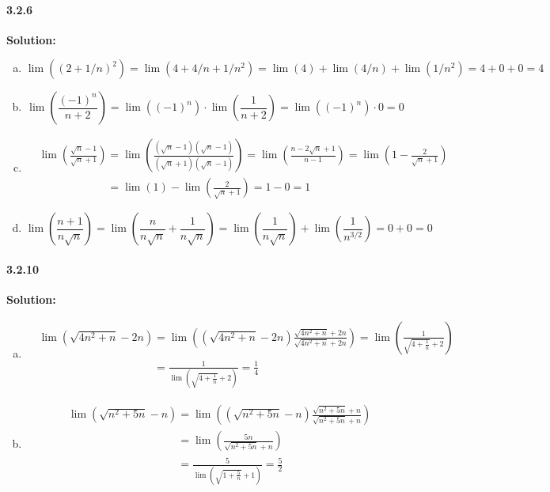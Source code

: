 \documentclass[11pt]{article}
\begin{document}
	\paragraph{3.2.6}\textbf{Solution:}
		\begin{enumerate}[(a)]
			\item 
				\[\lim \left((2 + 1/n)^2 \right) = \lim (4 + 4/n + 1/n^2) = \lim (4) + \lim(4/n) + \lim(1/n^2) = 4 + 0 + 0 = 4\]
			\item
				\[\lim \left(\frac{(-1)^n}{n + 2}\right) = \lim \left((-1)^n\right) \cdot \lim \left(\frac{1}{n + 2}\right) = \lim \left((-1)^n\right) \cdot 0 = 0 \]
			\item
				\begin{align}
					&\lim \left(\frac{\sqrt{n} - 1}{\sqrt{n} + 1}\right) = \lim \left(\frac{(\sqrt{n} - 1)(\sqrt{n} - 1)}{(\sqrt{n} + 1)(\sqrt{n} - 1)} \right) = \lim \left(\frac{n - 2\sqrt{n} + 1}{n - 1} \right) = \lim \left(1 - \frac{2}{\sqrt{n} + 1} \right)\nonumber\\
					&\phantom{\lim \left(\frac{\sqrt{n} - 1}{\sqrt{n} + 1}\right)} = \lim (1) - \lim \left(\frac{2}{\sqrt{n} + 1}\right) = 1 - 0 = 1\nonumber
				\end{align}
			\item
				\[\lim \left(\frac{n + 1}{n\sqrt{n}}\right) = \lim \left(\frac{n}{n\sqrt{n}} + \frac{1}{n\sqrt{n}}\right) = \lim \left(\frac{1}{n\sqrt{n}}\right) + \lim \left(\frac{1}{n^{3/2}}\right) = 0 + 0 = 0\]
		\end{enumerate}
	\paragraph{3.2.10}\textbf{Solution:}
		\begin{enumerate}[(a)]
			\item 
				\begin{align}
					&\lim (\sqrt{4n^2 + n} - 2n) = \lim \left((\sqrt{4n^2 + n} - 2n)\frac{\sqrt{4n^2 + n} + 2n}{\sqrt{4n^2 + n} + 2n}\right) = \lim \left(\frac{1}{\sqrt{4 + \frac{1}{n}} + 2}\right)\nonumber\\
					&\phantom{\lim (\sqrt{4n^2 + n} - 2n)} = \frac{1}{\lim \left(\sqrt{4 + \frac{1}{n}} + 2\right)} = \frac{1}{4} \nonumber
				\end{align}
			\item
				\begin{align}
					&\lim \left(\sqrt{n^2 + 5n} - n\right) = \lim \left((\sqrt{n^2 + 5n} - n)\frac{\sqrt{n^2 + 5n} + n}{\sqrt{n^2 + 5n} + n} \right)\nonumber\\
					&\phantom{\lim \left(\sqrt{n^2 + 5n} - n\right)} = \lim \left(\frac{5n}{\sqrt{n^2 + 5n} + n}\right)\nonumber\\
					&\phantom{\lim \left(\sqrt{n^2 + 5n} - n\right)} = \frac{5}{\lim \left(\sqrt{1 + \frac{5}{n}} + 1\right)} = \frac{5}{2}\nonumber
				\end{align}
				
		\end{enumerate}
\end{document}
